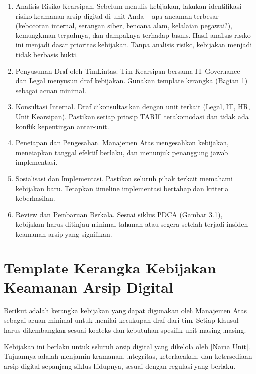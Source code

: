 \documentclass[12pt,a4paper]{report}
\begin{document}
\begin{enumerate}[leftmargin=*]
    \item Analisis Risiko Kearsipan. Sebelum menulis kebijakan, lakukan identifikasi risiko keamanan arsip digital di unit Anda -- apa ancaman terbesar (kebocoran internal, serangan siber, bencana alam, kelalaian pegawai?), kemungkinan terjadinya, dan dampaknya terhadap bisnis. Hasil analisis risiko ini menjadi dasar prioritas kebijakan. Tanpa analisis risiko, kebijakan menjadi tidak berbasis bukti.
    \item Penyusunan Draf oleh TimLintas. Tim Kearsipan bersama IT Governance dan Legal menyusun draf kebijakan. Gunakan template kerangka (Bagian \ref{sec:template-kebijakan}) sebagai acuan minimal.
    \item Konsultasi Internal. Draf dikonsultasikan dengan unit terkait (Legal, IT, HR, Unit Kearsipan). Pastikan setiap prinsip TARIF terakomodasi dan tidak ada konflik kepentingan antar-unit.
    \item Penetapan dan Pengesahan. Manajemen Atas mengesahkan kebijakan, menetapkan tanggal efektif berlaku, dan menunjuk penanggung jawab implementasi.
    \item Sosialisasi dan Implementasi. Pastikan seluruh pihak terkait memahami kebijakan baru. Tetapkan timeline implementasi bertahap dan kriteria keberhasilan.
    \item Review dan Pembaruan Berkala. Sesuai siklus PDCA (Gambar 3.1), kebijakan harus ditinjau minimal tahunan atau segera setelah terjadi insiden keamanan arsip yang signifikan.
\end{enumerate}

\section{Template Kerangka Kebijakan Keamanan Arsip Digital}
\label{sec:template-kebijakan}
Berikut adalah kerangka kebijakan yang dapat digunakan oleh Manajemen Atas sebagai acuan minimal untuk menilai kecukupan draf dari tim. Setiap klausul harus dikembangkan sesuai konteks dan kebutuhan spesifik unit masing-masing.

\begin{plnbox}
Kebijakan ini berlaku untuk seluruh arsip digital yang dikelola oleh [Nama Unit]. Tujuannya adalah menjamin keamanan, integritas, keterlacakan, dan ketersediaan arsip digital sepanjang siklus hidupnya, sesuai dengan regulasi yang berlaku.
\end{plnbox}
\end{document}
